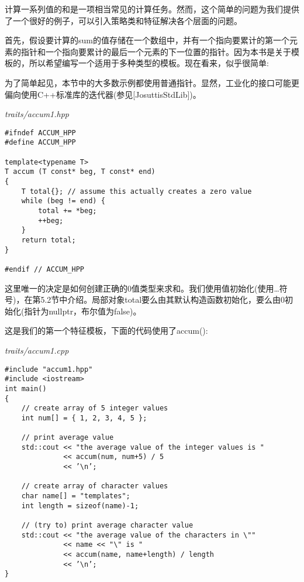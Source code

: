 
计算一系列值的和是一项相当常见的计算任务。然而，这个简单的问题为我们提供了一个很好的例子，可以引入策略类和特征解决各个层面的问题。


首先，假设要计算的sum的值存储在一个数组中，并有一个指向要累计的第一个元素的指针和一个指向要累计的最后一个元素的下一位置的指针。因为本书是关于模板的，所以希望编写一个适用于多种类型的模板。现在看来，似乎很简单:

\begin{tcolorbox}[colback=webgreen!5!white,colframe=webgreen!75!black]
\hspace*{0.75cm}为了简单起见，本节中的大多数示例都使用普通指针。显然，工业化的接口可能更偏向使用C++标准库的迭代器(参见[JosuttisStdLib])。
\end{tcolorbox}

\noindent
\textit{traits/accum1.hpp}
\begin{lstlisting}[style=styleCXX]
#ifndef ACCUM_HPP
#define ACCUM_HPP

template<typename T>
T accum (T const* beg, T const* end)
{
	T total{}; // assume this actually creates a zero value
	while (beg != end) {
		total += *beg;
		++beg;
	}
	return total;
}

#endif // ACCUM_HPP
\end{lstlisting}

这里唯一的决定是如何创建正确的0值类型来求和。我们使用值初始化(使用{…}符号)，在第5.2节中介绍。局部对象total要么由其默认构造函数初始化，要么由0初始化(指针为nullptr，布尔值为false)。

这是我们的第一个特征模板，下面的代码使用了accum():

\noindent
\textit{traits/accum1.cpp}
\begin{lstlisting}[style=styleCXX]
#include "accum1.hpp"
#include <iostream>
int main()
{
	// create array of 5 integer values
	int num[] = { 1, 2, 3, 4, 5 };
	
	// print average value
	std::cout << "the average value of the integer values is "
			  << accum(num, num+5) / 5
			  << ’\n’;
			  
	// create array of character values
	char name[] = "templates";
	int length = sizeof(name)-1;
	
	// (try to) print average character value
	std::cout << "the average value of the characters in \""
			  << name << "\" is "
			  << accum(name, name+length) / length
			  << ’\n’;
}
\end{lstlisting}

